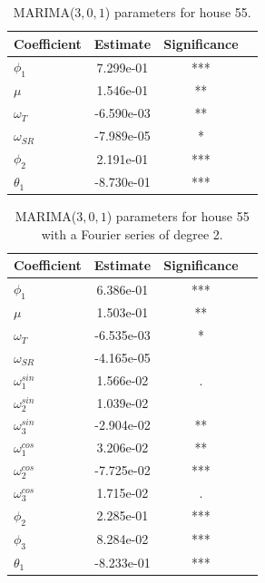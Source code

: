     \begin{table}[]
        \centering
        \begin{tabular}{l|ccc}
        \hline
        Coefficient & Estimate & Significance\\ \hline \hline
        $\phi_1$ & 7.299e-01 & *** \\
        $\mu$ & 1.546e-01 & ** \\
        $\omega_{T}$ & -6.590e-03 & ** \\
        $\omega_{SR}$ & -7.989e-05 & * \\
        $\phi_2$ & 2.191e-01 &  *** \\
        $\theta_1$ & -8.730e-01 & *** \\
        \hline
        \end{tabular}
        \caption{MARIMA($3,0,1$) parameters for house 55.}
        \label{tab: MARIMAparam55}
     \end{table}
    
     \begin{table}[]
        \centering
        \begin{tabular}{l|ccc}
        \hline
        Coefficient & Estimate & Significance\\ \hline \hline
        $\phi_1$ & 6.386e-01 & *** \\
        $\mu$ & 1.503e-01 & ** \\
        $\omega_{T}$ & -6.535e-03 & * \\
        $\omega_{SR}$ & -4.165e-05 &  \\
        $\omega^{sin}_1$ & 1.566e-02 & . \\
        $\omega^{sin}_2$ & 1.039e-02 & \\
        $\omega^{sin}_3$ & -2.904e-02 & **\\
        $\omega^{cos}_1$ & 3.206e-02 & ** \\
        $\omega^{cos}_2$ & -7.725e-02 & *** \\
        $\omega^{cos}_3$ & 1.715e-02 & . \\
        $\phi_2$ & 2.285e-01 & *** \\
        $\phi_3$ & 8.284e-02 & *** \\
        $\theta_1$ & -8.233e-01 & *** \\
        \hline
        \end{tabular}
        \caption{MARIMA($3,0,1$) parameters for house 55 with a Fourier series of degree 2.}
        \label{tab: MARIMAparam55_fourier}
     \end{table}
    

